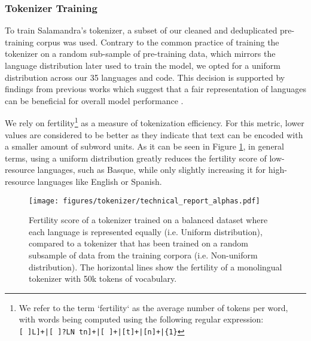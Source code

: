 \subsubsection{Tokenizer Training}

To train Salamandra's tokenizer, a subset of our cleaned and deduplicated pre-training corpus was used. Contrary to the common practice of training the tokenizer on a random sub-sample of pre-training data, which mirrors the language distribution later used to train the model, we opted for a uniform distribution across our 35 languages and code. This decision is supported by findings from previous works which suggest that a fair representation of languages can be beneficial for overall model performance \cite{flor}.


We rely on fertility\footnote{We refer to the term `fertility` as the average number of tokens per word, with words being computed using the following regular expression:\\ 
\texttt{[ ]L]+|[ ]?LN tn]+|[ ]+|[t]+|[n]+|\{1\}}
} as a measure of tokenization efficiency. For this metric, lower values are considered to be better as they indicate that text can be encoded with a smaller amount of subword units. As it can be seen in Figure \ref{fig:alphas_plot}, in general terms, using a uniform distribution greatly reduces the fertility score of low-resource languages, such as Basque, while only slightly increasing it for high-resource languages like English or Spanish.

\begin{figure}[htbp]
    \centering
    \texttt{[image: figures/tokenizer/technical\_report\_alphas.pdf]}
    \caption{Fertility score of a tokenizer trained on a balanced dataset where each language is represented equally (i.e. Uniform distribution), compared to a tokenizer that has been trained on a random subsample of data from the training corpora (i.e. Non-uniform distribution). The horizontal lines show the fertility of a monolingual tokenizer with 50k tokens of vocabulary.}
    \label{fig:alphas_plot}
\end{figure}

